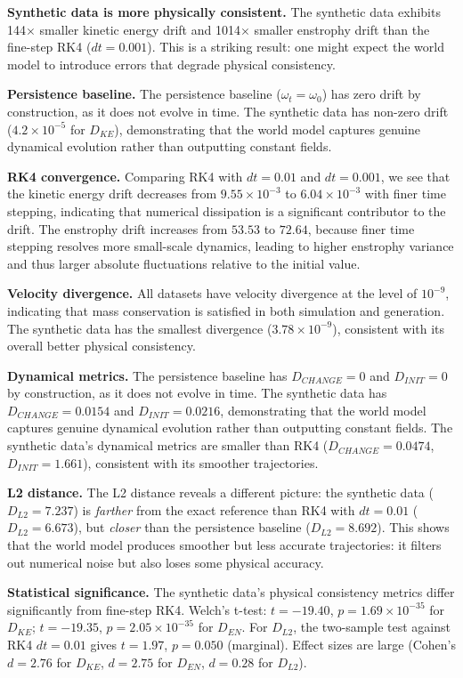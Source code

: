 \documentclass[reprint,aps,pre]{revtex4-2}
\begin{document}
\textbf{Synthetic data is more physically consistent.} The synthetic data exhibits 144$\times$ smaller kinetic energy drift and 1014$\times$ smaller enstrophy drift than the fine-step RK4 ($dt=0.001$). This is a striking result: one might expect the world model to introduce errors that degrade physical consistency.

\textbf{Persistence baseline.} The persistence baseline ($\omega_t = \omega_0$) has zero drift by construction, as it does not evolve in time. The synthetic data has non-zero drift ($4.2\times10^{-5}$ for $D_{KE}$), demonstrating that the world model captures genuine dynamical evolution rather than outputting constant fields.

\textbf{RK4 convergence.} Comparing RK4 with $dt=0.01$ and $dt=0.001$, we see that the kinetic energy drift decreases from $9.55\times10^{-3}$ to $6.04\times10^{-3}$ with finer time stepping, indicating that numerical dissipation is a significant contributor to the drift. The enstrophy drift increases from $53.53$ to $72.64$, because finer time stepping resolves more small-scale dynamics, leading to higher enstrophy variance and thus larger absolute fluctuations relative to the initial value.

\textbf{Velocity divergence.} All datasets have velocity divergence at the level of $10^{-9}$, indicating that mass conservation is satisfied in both simulation and generation. The synthetic data has the smallest divergence ($3.78\times10^{-9}$), consistent with its overall better physical consistency.

\textbf{Dynamical metrics.} The persistence baseline has $D_{CHANGE} = 0$ and $D_{INIT} = 0$ by construction, as it does not evolve in time. The synthetic data has $D_{CHANGE} = 0.0154$ and $D_{INIT} = 0.0216$, demonstrating that the world model captures genuine dynamical evolution rather than outputting constant fields. The synthetic data's dynamical metrics are smaller than RK4 ($D_{CHANGE} = 0.0474$, $D_{INIT} = 1.661$), consistent with its smoother trajectories.

\textbf{L2 distance.} The L2 distance reveals a different picture: the synthetic data ($D_{L2} = 7.237$) is \textit{farther} from the exact reference than RK4 with $dt=0.01$ ($D_{L2} = 6.673$), but \textit{closer} than the persistence baseline ($D_{L2} = 8.692$). This shows that the world model produces smoother but less accurate trajectories: it filters out numerical noise but also loses some physical accuracy.

\textbf{Statistical significance.} The synthetic data's physical consistency metrics differ significantly from fine-step RK4. Welch's t-test: $t = -19.40$, $p = 1.69 \times 10^{-35}$ for $D_{KE}$; $t = -19.35$, $p = 2.05 \times 10^{-35}$ for $D_{EN}$. For $D_{L2}$, the two-sample test against RK4 $dt=0.01$ gives $t = 1.97$, $p = 0.050$ (marginal). Effect sizes are large (Cohen's $d = 2.76$ for $D_{KE}$, $d = 2.75$ for $D_{EN}$, $d = 0.28$ for $D_{L2}$).
\end{document}
